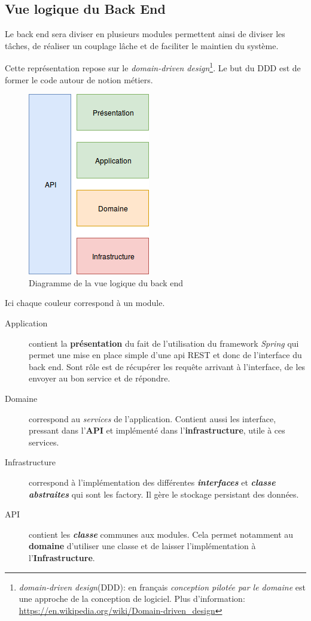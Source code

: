 \documentclass[12pt]{article}
\begin{document}
\subsection{Vue logique du Back End}
Le back end sera diviser en plusieurs modules permettent ainsi de diviser les tâches, de réaliser un couplage lâche et de faciliter le maintien du système.

Cette représentation repose sur le \textit{domain-driven design}\footnote{\textit{domain-driven design}(DDD): en français \textit{conception pilotée par le domaine} est une approche de la conception de logiciel. Plus d'information: \url{https://en.wikipedia.org/wiki/Domain-driven_design}}. Le but du DDD est de former le code autour de notion métiers.

\begin{figure}[h]
    \centering
    \includegraphics[]{img/Vue_logique_back.png}
    \caption{Diagramme de la vue logique du back end}
\end{figure}

Ici chaque couleur correspond à un module.


\begin{description}
    \item [Application] contient la \textbf{présentation} du fait de l'utilisation du framework \textit{Spring} qui permet une mise en place simple d'une api REST et donc de l'interface du back end. Sont rôle est de récupérer les requête arrivant à l'interface, de les envoyer au bon service et de répondre.
    \item [Domaine] correspond au \textit{services} de l'application. Contient aussi les interface, pressant  dans l'\textbf{API} et implémenté dans l'\textbf{infrastructure}, utile à ces services.
    \item [Infrastructure] correspond à l'implémentation des différentes \textbf{\textit{interfaces}} et \textbf{\textit{classe abstraites}} qui sont les factory. Il gère le stockage persistant des données.
    \item [API] contient les \textbf{\textit{classe}} communes aux modules. Cela permet notamment au \textbf{domaine} d'utiliser une classe et de laisser l'implémentation à l'\textbf{Infrastructure}.
\end{description}
\end{document}
